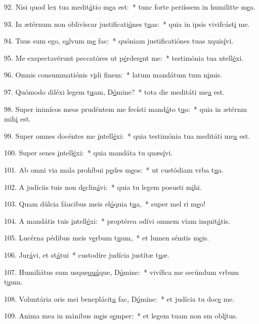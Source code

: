 92. Nisi quod lex tua medit\uline{á}tio m\uline{e}a est:~* tunc forte periíssem in humilitte m\uline{e}a.\par 
93. In ætérnum non oblivíscar justificati\uline{ó}nes t\uline{u}as:~* quia in ipsis vivifcást\uline{i} me.\par 
94. Tuus sum ego, s\uline{a}lvum m\uline{e} fac:~* quóniam justificatiónes tuas xquis\uline{í}vi.\par 
95. Me exspectavérunt peccatóres ut p\uline{é}rder\uline{e}nt me:~* testimónia tua ntell\uline{é}xi.\par 
96. Omnis consummatiónis v\uline{i}di f\uline{i}nem:~* latum mandátum tum n\uline{i}mis.\par 
97. Quómodo diléxi legem t\uline{u}am, D\uline{ó}mine?~* tota die meditáti me\uline{a} est.\par 
98. Super inimícos meos prudéntem me fecísti mand\uline{á}to t\uline{u}o:~* quia in ætérnm mih\uline{i} est.\par 
99. Super omnes docéntes me \uline{i}ntell\uline{é}xi:~* quia testimónia tua meditáti me\uline{a} est.\par 
100. Super senes \uline{i}ntell\uline{é}xi:~* quia mandáta tu quæs\uline{í}vi.\par 
101. Ab omni via mala prohíbui p\uline{e}des m\uline{e}os:~* ut custódiam vrba t\uline{u}a.\par 
102. A judíciis tuis non d\uline{e}clin\uline{á}vi:~* quia tu legem posusti m\uline{i}hi.\par 
103. Quam dúlcia fáucibus meis el\uline{ó}quia t\uline{u}a,~* super mel ri m\uline{e}o!\par 
104. A mandátis tuis \uline{i}ntell\uline{é}xi:~* proptérea odívi omnem viam inquit\uline{á}tis.\par 
105. Lucérna pédibus meis v\uline{e}rbum t\uline{u}um,~* et lumen sémtis m\uline{e}is.\par 
106. Jur\uline{á}vi, et st\uline{á}tui~* custodíre judícia justítæ t\uline{u}æ.\par 
107. Humiliátus sum usque\uline{quá}que, D\uline{ó}mine:~* vivífica me secúndum vrbum t\uline{u}um.\par 
108. Voluntária oris mei beneplácit\uline{a} fac, D\uline{ó}mine:~* et judícia tu doc\uline{e} me.\par 
109. Anima mea in mánibus m\uline{e}is s\uline{e}mper:~* et legem tuam non sm obl\uline{í}tus.\par 
